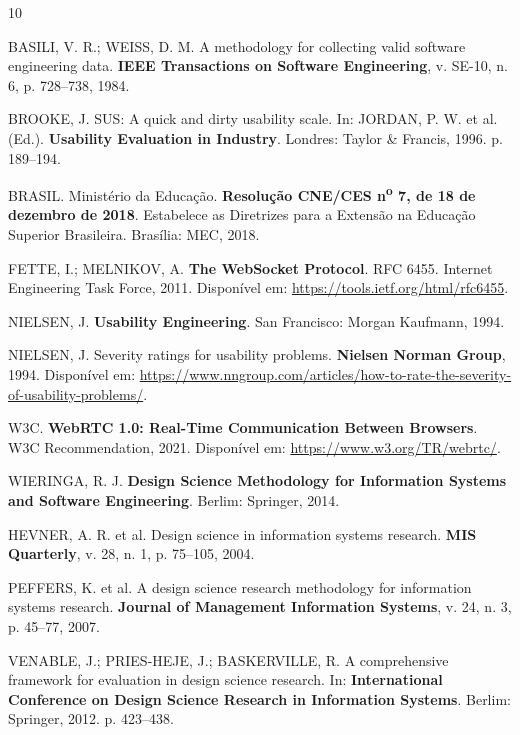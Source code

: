 \documentclass[12pt]{article}
\begin{document}
\begin{thebibliography}{10}

BASILI, V. R.; WEISS, D. M.
A methodology for collecting valid software engineering data.
\textbf{IEEE Transactions on Software Engineering}, v. SE-10, n. 6,
p. 728--738, 1984.

BROOKE, J.
SUS: A quick and dirty usability scale.
In: JORDAN, P. W. et al. (Ed.).
\textbf{Usability Evaluation in Industry}.
Londres: Taylor \& Francis, 1996. p. 189--194.

BRASIL. Ministério da Educação.
\textbf{Resolução CNE/CES n\textsuperscript{o} 7, de 18 de dezembro de 2018}.
Estabelece as Diretrizes para a Extensão na Educação Superior Brasileira.
Brasília: MEC, 2018.

FETTE, I.; MELNIKOV, A.
\textbf{The WebSocket Protocol}.
RFC 6455. Internet Engineering Task Force, 2011.
Disponível em: \url{https://tools.ietf.org/html/rfc6455}.

NIELSEN, J.
\textbf{Usability Engineering}.
San Francisco: Morgan Kaufmann, 1994.

NIELSEN, J.
Severity ratings for usability problems.
\textbf{Nielsen Norman Group}, 1994.
Disponível em: \url{https://www.nngroup.com/articles/how-to-rate-the-severity-of-usability-problems/}.

W3C.
\textbf{WebRTC 1.0: Real-Time Communication Between Browsers}.
W3C Recommendation, 2021.
Disponível em: \url{https://www.w3.org/TR/webrtc/}.

WIERINGA, R. J.
\textbf{Design Science Methodology for Information Systems and Software Engineering}.
Berlim: Springer, 2014.

HEVNER, A. R. et al.
Design science in information systems research.
\textbf{MIS Quarterly}, v. 28, n. 1, p. 75--105, 2004.

PEFFERS, K. et al.
A design science research methodology for information systems research.
\textbf{Journal of Management Information Systems}, v. 24, n. 3, p. 45--77, 2007.

VENABLE, J.; PRIES-HEJE, J.; BASKERVILLE, R.
A comprehensive framework for evaluation in design science research.
In: \textbf{International Conference on Design Science Research in Information Systems}.
Berlim: Springer, 2012. p. 423--438.


\end{thebibliography}
\end{document}
